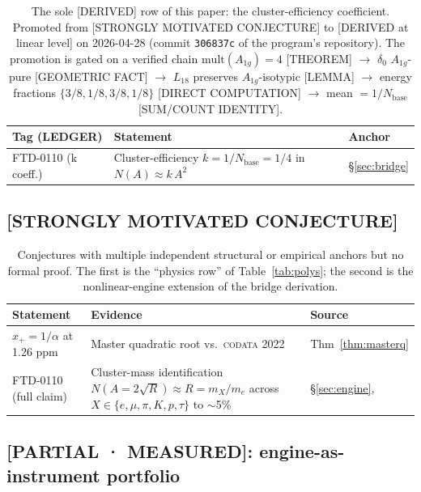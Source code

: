 \documentclass[11pt,reqno]{amsart}
\theoremstyle{plain}
\theoremstyle{definition}
\theoremstyle{remark}
\numberwithin{equation}{section}
\newcommand{\Aoneg}{A_{1g}}
\newcommand{\Nbase}{N_{\mathrm{base}}}
\begin{document}
\begin{table}[h]
\centering
\small
\begin{tabular}{l p{7.5cm} l}
\toprule
Tag (LEDGER) & Statement & Anchor \\
\midrule
FTD-0110 (k coeff.) & Cluster-efficiency $k = 1/\Nbase = 1/4$ in $N(A) \approx k\,A^{2}$ & \S\ref{sec:bridge} \\
\bottomrule
\end{tabular}
\caption{The sole [DERIVED] row of this paper: the cluster-efficiency
coefficient. Promoted from [STRONGLY MOTIVATED CONJECTURE] to
[DERIVED at linear level] on 2026-04-28 (commit \texttt{306837c}
of the program's repository). The promotion is gated on a verified
chain $\mathrm{mult}(\Aoneg) = 4$ [THEOREM] $\to$ $\delta_{0}$
$\Aoneg$-pure [GEOMETRIC FACT] $\to$ $L_{18}$ preserves
$\Aoneg$-isotypic [LEMMA] $\to$ energy fractions
$\{3/8, 1/8, 3/8, 1/8\}$ [DIRECT COMPUTATION] $\to$ mean
$= 1/\Nbase$ [SUM/COUNT IDENTITY].}
\label{tab:derived}
\end{table}

\subsection{[STRONGLY MOTIVATED CONJECTURE]}

\begin{table}[h]
\centering
\small
\begin{tabular}{l p{8.5cm} l}
\toprule
Statement & Evidence & Source \\
\midrule
$x_{+} = 1/\alpha$ at 1.26 ppm & Master quadratic root vs.\ \textsc{codata} 2022 & Thm~\ref{thm:masterq} \\
\midrule
FTD-0110 (full claim) & Cluster-mass identification $N(A = 2\sqrt{R}) \approx R = m_X/m_e$ across $X \in \{e, \mu, \pi, K, p, \tau\}$ to $\sim$5\% & \S\ref{sec:engine}, \cite{ledger} \\
\bottomrule
\end{tabular}
\caption{Conjectures with multiple independent structural or
empirical anchors but no formal proof. The first is the
``physics row'' of Table~\ref{tab:polys}; the second is the
nonlinear-engine extension of the bridge derivation.}
\label{tab:conjectures}
\end{table}

\subsection{[PARTIAL · MEASURED]: engine-as-instrument portfolio}
\end{document}
